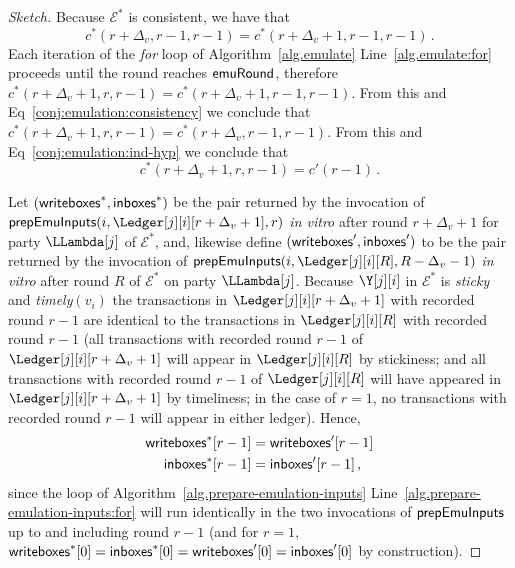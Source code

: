\begin{proof}[Sketch]
  Because $\mathcal{E}^*$ is consistent, we have that
  \begin{equation}\label{conj:emulation:consistency}
    c^*(r + \Delta_v, r - 1, r - 1) = c^*(r + \Delta_v + 1, r - 1, r - 1)\,.
  \end{equation}
  Each iteration of the \emph{for} loop of Algorithm~\ref{alg.emulate} Line~\ref{alg.emulate:for}
  proceeds until the round reaches $\textsf{emuRound}$, therefore
  $c^*(r + \Delta_v + 1, r, r - 1) = c^*(r + \Delta_v + 1, r - 1, r - 1)$.
  From this and Eq~\ref{conj:emulation:consistency} we conclude that
  $c^*(r + \Delta_v + 1, r, r - 1) = c^*(r + \Delta_v, r - 1, r - 1)$.
  From this and Eq~\ref{conj:emulation:ind-hyp} we conclude that
  \begin{equation}\label{conj:emulation:pre-state}
    c^*(r + \Delta_v + 1, r, r - 1) = c'(r - 1)\,.
  \end{equation}

  Let $(\textsf{writeboxes}^*, \textsf{inboxes}^*)$
  be the pair
  returned by the invocation of $\prepareEmulationInputs(i, \Ledger[j][i][r + \Delta_v + 1], r)$
  \emph{in vitro} after round $r + \Delta_v + 1$ for party $\LLambda[j]$ of $\mathcal{E}^*$, and, likewise define
  $(\textsf{writeboxes}', \textsf{inboxes}')$ to be the pair
  returned by the invocation of $\prepareEmulationInputs(i, \Ledger[j][i][R], R - \Delta_v - 1)$
  \emph{in vitro} after round $R$ of $\mathcal{E}^*$ on party $\LLambda[j]$.
  Because $\Y[j][i]$ in $\mathcal{E}^*$ is \emph{sticky} and \emph{timely}$(v_i)$
  the transactions in
  $\Ledger[j][i][r + \Delta_v + 1]$ with recorded round $r - 1$ are identical to
  the transactions in $\Ledger[j][i][R]$ with recorded round $r - 1$
  (all transactions with recorded round $r - 1$ of $\Ledger[j][i][r + \Delta_v + 1]$
   will appear in $\Ledger[j][i][R]$ by stickiness;
   and all transactions with recorded round $r - 1$ of $\Ledger[j][i][R]$ will
   have appeared in $\Ledger[j][i][r + \Delta_v + 1]$ by timeliness; in the case of
   $r = 1$, no transactions with recorded round $r - 1$ will appear in either
   ledger).
  Hence,
  \begin{align}
    \textsf{writeboxes}^*[r - 1] &= \textsf{writeboxes}'[r - 1]\label{conj:emulation:eq-inputs-writes}\\
    \textsf{inboxes}^*[r - 1] &= \textsf{inboxes}'[r - 1]\label{conj:emulation:eq-inputs-inboxes}\,,
  \end{align}
  since the loop of Algorithm~\ref{alg.prepare-emulation-inputs} Line~\ref{alg.prepare-emulation-inputs:for}
  will run identically in the two invocations of $\textsf{prepEmuInputs}$ up to
  and including round $r - 1$ (and for
  $r = 1$, $\textsf{writeboxes}^*[0] = \textsf{inboxes}^*[0] = \textsf{writeboxes}'[0] = \textsf{inboxes}'[0]$ by construction).


\end{proof}
